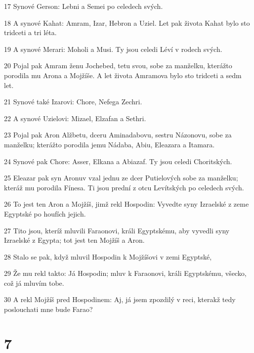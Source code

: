 \par 17 Synové Gerson: Lebni a Semei po celedech svých.
\par 18 A synové Kahat: Amram, Izar, Hebron a Uziel. Let pak života Kahat bylo sto tridceti a tri léta.
\par 19 A synové Merari: Moholi a Musi. Ty jsou celedi Léví v rodech svých.
\par 20 Pojal pak Amram ženu Jochebed, tetu svou, sobe za manželku, kterážto porodila mu Arona a Mojžíše. A let života Amramova bylo sto tridceti a sedm let.
\par 21 Synové také Izarovi: Chore, Nefega Zechri.
\par 22 A synové Uzielovi: Mizael, Elzafan a Sethri.
\par 23 Pojal pak Aron Alžbetu, dceru Aminadabovu, sestru Názonovu, sobe za manželku; kterážto porodila jemu Nádaba, Abiu, Eleazara a Itamara.
\par 24 Synové pak Chore: Asser, Elkana a Abiazaf. Ty jsou celedi Choritských.
\par 25 Eleazar pak syn Aronuv vzal jednu ze dcer Putielových sobe za manželku; kteráž mu porodila Fínesa. Ti jsou prední z otcu Levítských po celedech svých.
\par 26 To jest ten Aron a Mojžíš, jimž rekl Hospodin: Vyvedte syny Izraelské z zeme Egyptské po houfích jejich.
\par 27 Tito jsou, kteríž mluvili Faraonovi, králi Egyptskému, aby vyvedli syny Izraelské z Egypta; tot jest ten Mojžíš a Aron.
\par 28 Stalo se pak, když mluvil Hospodin k Mojžíšovi v zemi Egyptské,
\par 29 Že mu rekl takto: Já Hospodin; mluv k Faraonovi, králi Egyptskému, všecko, což já mluvím tobe.
\par 30 A rekl Mojžíš pred Hospodinem: Aj, já jsem zpozdilý v reci, kterakž tedy poslouchati mne bude Farao?

\chapter{7}

